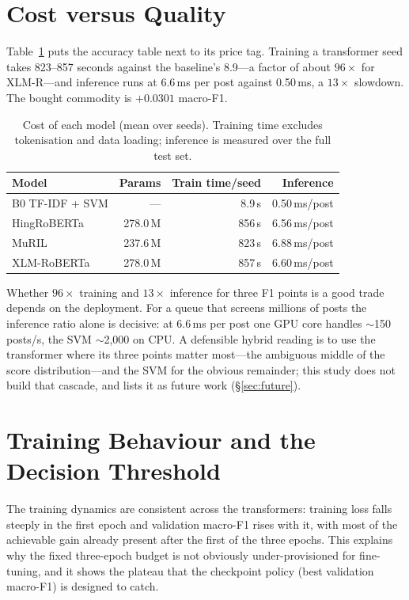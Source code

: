 \section{Cost versus Quality}
\label{sec:cost}

Table~\ref{tab:costs} puts the accuracy table next to its price tag. Training a transformer seed takes 823--857 seconds against the
baseline's 8.9---a factor of about $96\times$ for XLM-R---and inference runs at
6.6\,ms per post against 0.50\,ms, a $13\times$ slowdown. The bought commodity is
$+0.0301$ macro-F1.

\begin{table}[htbp]
\centering
\caption[Cost of each model (mean over seeds)]{Cost of each model (mean over seeds). Training time excludes tokenisation
and data loading; inference is measured over the full test set.}
\label{tab:costs}
\small
\begin{tabular}{lrrr}
\toprule
Model & Params & Train time/seed & Inference \\
\midrule
B0 TF-IDF + SVM & --- & 8.9\,s & 0.50\,ms/post \\
HingRoBERTa & 278.0\,M & 856\,s & 6.56\,ms/post \\
MuRIL & 237.6\,M & 823\,s & 6.88\,ms/post \\
XLM-RoBERTa & 278.0\,M & 857\,s & 6.60\,ms/post \\
\bottomrule
\end{tabular}
\end{table}

Whether $96\times$ training and $13\times$ inference for three F1 points is a
good trade depends on the deployment. For a queue that screens millions of posts
the inference ratio alone is decisive: at 6.6\,ms per post one GPU core handles
$\sim$150 posts/s, the SVM $\sim$2{,}000 on CPU. A defensible hybrid reading is
to use the transformer where its three points matter most---the ambiguous middle
of the score distribution---and the SVM for the obvious remainder; this study
does not build that cascade, and lists it as future work (\S\ref{sec:future}).

\section{Training Behaviour and the Decision Threshold}
\label{sec:threshold}

The training dynamics are consistent across the transformers: training loss falls
steeply in the first epoch and validation macro-F1 rises with it, with most of the
achievable gain already present after the first of the three epochs. This explains
why the fixed three-epoch budget is not obviously under-provisioned for
fine-tuning, and it shows the plateau that the checkpoint policy (best validation
macro-F1) is designed to catch.

